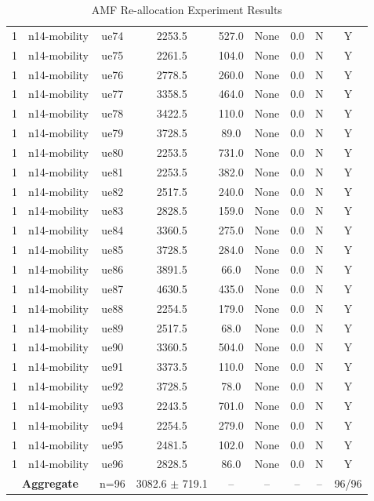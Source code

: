 \begin{table}[ht]
\begin{tabular}{|c|c|c|c|c|c|c|c|c|}
1 & n14-mobility & ue74 & 2253.5 & 527.0 & None & 0.0 & N & Y \\
1 & n14-mobility & ue75 & 2261.5 & 104.0 & None & 0.0 & N & Y \\
1 & n14-mobility & ue76 & 2778.5 & 260.0 & None & 0.0 & N & Y \\
1 & n14-mobility & ue77 & 3358.5 & 464.0 & None & 0.0 & N & Y \\
1 & n14-mobility & ue78 & 3422.5 & 110.0 & None & 0.0 & N & Y \\
1 & n14-mobility & ue79 & 3728.5 & 89.0 & None & 0.0 & N & Y \\
1 & n14-mobility & ue80 & 2253.5 & 731.0 & None & 0.0 & N & Y \\
1 & n14-mobility & ue81 & 2253.5 & 382.0 & None & 0.0 & N & Y \\
1 & n14-mobility & ue82 & 2517.5 & 240.0 & None & 0.0 & N & Y \\
1 & n14-mobility & ue83 & 2828.5 & 159.0 & None & 0.0 & N & Y \\
1 & n14-mobility & ue84 & 3360.5 & 275.0 & None & 0.0 & N & Y \\
1 & n14-mobility & ue85 & 3728.5 & 284.0 & None & 0.0 & N & Y \\
1 & n14-mobility & ue86 & 3891.5 & 66.0 & None & 0.0 & N & Y \\
1 & n14-mobility & ue87 & 4630.5 & 435.0 & None & 0.0 & N & Y \\
1 & n14-mobility & ue88 & 2254.5 & 179.0 & None & 0.0 & N & Y \\
1 & n14-mobility & ue89 & 2517.5 & 68.0 & None & 0.0 & N & Y \\
1 & n14-mobility & ue90 & 3360.5 & 504.0 & None & 0.0 & N & Y \\
1 & n14-mobility & ue91 & 3373.5 & 110.0 & None & 0.0 & N & Y \\
1 & n14-mobility & ue92 & 3728.5 & 78.0 & None & 0.0 & N & Y \\
1 & n14-mobility & ue93 & 2243.5 & 701.0 & None & 0.0 & N & Y \\
1 & n14-mobility & ue94 & 2254.5 & 279.0 & None & 0.0 & N & Y \\
1 & n14-mobility & ue95 & 2481.5 & 102.0 & None & 0.0 & N & Y \\
1 & n14-mobility & ue96 & 2828.5 & 86.0 & None & 0.0 & N & Y \\
\multicolumn{2}{|c|}{\textbf{Aggregate}} & n=96 & 3082.6 $\pm$ 719.1 & -- & -- & -- & -- & 96/96 \\
\hline
\end{tabular}
\caption{AMF Re-allocation Experiment Results}
\label{tab:amf_realloc}
\end{table}
